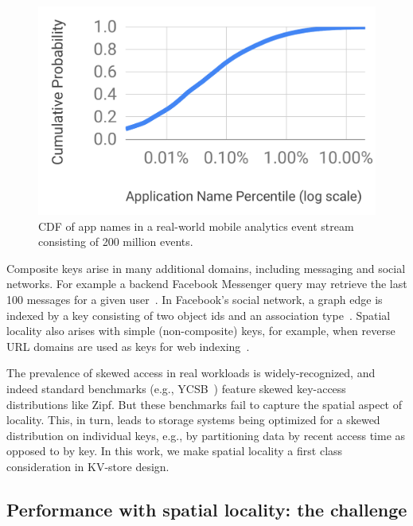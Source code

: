 \begin{figure}[tb]
\centering
\includegraphics[width=0.7\columnwidth]{figs/cdf.pdf}
\caption{CDF of app names in a real-world mobile analytics event stream consisting of 200 million events.}
\label{fig:cdf}
\end{figure}

Composite keys arise in many additional domains, including messaging and social networks. 
For example a backend Facebook Messenger query may retrieve the last 100 messages for a 
given user~\cite{Borthakur:2011:AHG:1989323.1989438}. %
In Facebook's social network, a graph edge is indexed by a key consisting of two 
object ids and an association type~\cite{Armstrong:2013:LDB:2463676.2465296}.
Spatial locality   also arises with simple (non-composite) keys, for example, when 
reverse  URL domains are used as keys for web  indexing~\cite{Cho:1998:ECT:297805.297835}. 

The prevalence of skewed  access  in real workloads is widely-recognized, 
and indeed standard benchmarks (e.g., YCSB~\cite{YCSB})  feature skewed key-access distributions like Zipf.
But 
these benchmarks fail to capture the spatial aspect of locality.
This, in turn, leads to storage systems being optimized for a skewed distribution on individual keys, %
e.g., by partitioning data by recent access time as opposed to by key.
In this work, we make spatial locality a first class consideration in KV-store design.



\subsection{Performance with spatial locality: the challenge }  

